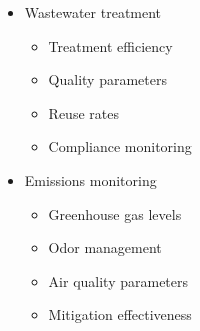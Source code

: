 \begin{itemize}
\begin{itemize}
        \item Wastewater treatment
        \begin{itemize}
            \item Treatment efficiency
            \item Quality parameters
            \item Reuse rates
            \item Compliance monitoring
        \end{itemize}
        
        \item Emissions monitoring
        \begin{itemize}
            \item Greenhouse gas levels
            \item Odor management
            \item Air quality parameters
            \item Mitigation effectiveness
        \end{itemize}
    \end{itemize}
\end{itemize}

